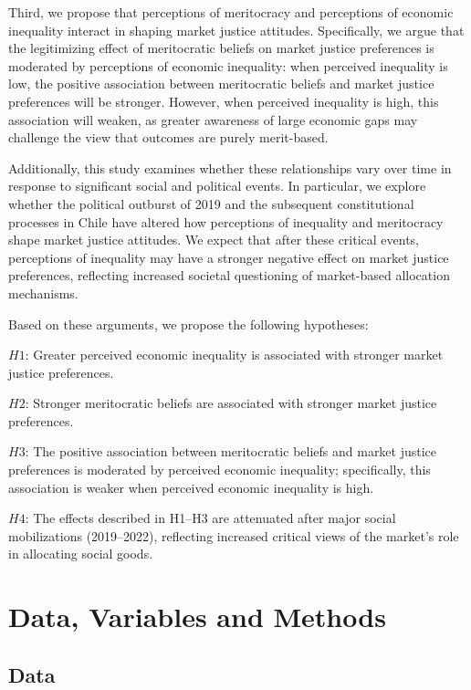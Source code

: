 \documentclass[
  12pt,
]{article}
\begin{document}
Third, we propose that perceptions of meritocracy and perceptions of
economic inequality interact in shaping market justice attitudes.
Specifically, we argue that the legitimizing effect of meritocratic
beliefs on market justice preferences is moderated by perceptions of
economic inequality: when perceived inequality is low, the positive
association between meritocratic beliefs and market justice preferences
will be stronger. However, when perceived inequality is high, this
association will weaken, as greater awareness of large economic gaps may
challenge the view that outcomes are purely merit-based.

Additionally, this study examines whether these relationships vary over
time in response to significant social and political events. In
particular, we explore whether the political outburst of 2019 and the
subsequent constitutional processes in Chile have altered how
perceptions of inequality and meritocracy shape market justice
attitudes. We expect that after these critical events, perceptions of
inequality may have a stronger negative effect on market justice
preferences, reflecting increased societal questioning of market-based
allocation mechanisms.

Based on these arguments, we propose the following hypotheses:

\(H1\): Greater perceived economic inequality is associated with
stronger market justice preferences.

\(H2\): Stronger meritocratic beliefs are associated with stronger
market justice preferences.

\(H3\): The positive association between meritocratic beliefs and market
justice preferences is moderated by perceived economic inequality;
specifically, this association is weaker when perceived economic
inequality is high.

\(H4\): The effects described in H1--H3 are attenuated after major
social mobilizations (2019--2022), reflecting increased critical views
of the market's role in allocating social goods.

\section{Data, Variables and Methods}\label{data-variables-and-methods}

\subsection{Data}\label{data}
\end{document}
